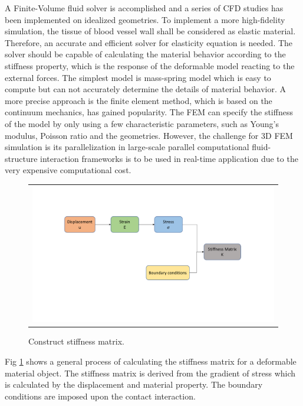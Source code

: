 A Finite-Volume fluid solver \cite{liang2007large, liang2007large, liang2009effect} is accomplished and a series of CFD studies has been implemented on idealized geometries. To implement a more high-fidelity simulation, the tissue of blood vessel wall shall be considered as elastic material. Therefore, an accurate and efficient solver for elasticity equation is needed. The solver should be capable of calculating the material behavior according to the stiffness property, which is the response of the deformable model reacting to the external forces. The simplest model is mass-spring model which is easy to compute but can not accurately determine the details of material behavior. A more precise approach is the finite element method, which is based on the continuum mechanics, has gained popularity. The FEM can specify the stiffness of the model by only using a few characteristic parameters, such as Young's modulus, Poisson ratio and the geometries. However, the challenge for 3D FEM simulation is its parallelization in large-scale parallel computational fluid-structure interaction frameworks is to be used in real-time application due to the very expensive computational cost. 

\begin{figure}[H]
	\centering
	\begin{tabular}{c}
		\includegraphics[width=1.2\textwidth]{./pics/construct_matrix}
	\end{tabular}
	\caption{\footnotesize Construct stiffness matrix.} \label{fig: ch1f2}
\end{figure}

Fig \ref{fig: ch1f2} shows a general process of calculating the stiffness matrix for a deformable material object. The stiffness matrix is derived from the gradient of stress which is calculated by the displacement and material property. The boundary conditions are imposed upon the contact interaction.

